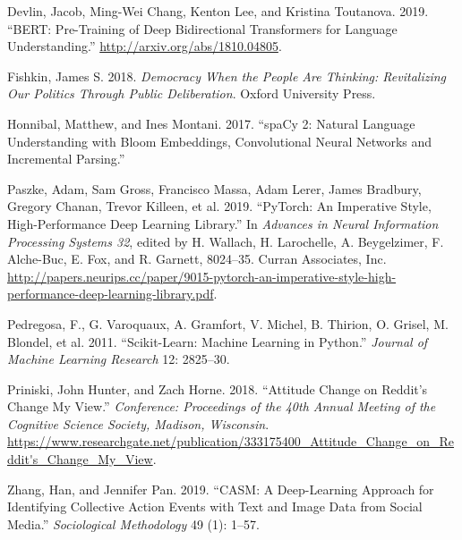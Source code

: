 \documentclass[12pt,]{article}
\begin{document}
\hypertarget{refs}{}
\leavevmode\hypertarget{ref-bert}{}%
Devlin, Jacob, Ming-Wei Chang, Kenton Lee, and Kristina Toutanova. 2019.
``BERT: Pre-Training of Deep Bidirectional Transformers for Language
Understanding.'' \url{http://arxiv.org/abs/1810.04805}.

\leavevmode\hypertarget{ref-fishkin}{}%
Fishkin, James S. 2018. \emph{Democracy When the People Are Thinking:
Revitalizing Our Politics Through Public Deliberation}. Oxford
University Press.

\leavevmode\hypertarget{ref-spacy2}{}%
Honnibal, Matthew, and Ines Montani. 2017. ``spaCy 2: Natural Language
Understanding with Bloom Embeddings, Convolutional Neural Networks and
Incremental Parsing.''

\leavevmode\hypertarget{ref-pytorch}{}%
Paszke, Adam, Sam Gross, Francisco Massa, Adam Lerer, James Bradbury,
Gregory Chanan, Trevor Killeen, et al. 2019. ``PyTorch: An Imperative
Style, High-Performance Deep Learning Library.'' In \emph{Advances in
Neural Information Processing Systems 32}, edited by H. Wallach, H.
Larochelle, A. Beygelzimer, F. Alche-Buc, E. Fox, and R. Garnett,
8024--35. Curran Associates, Inc.
\url{http://papers.neurips.cc/paper/9015-pytorch-an-imperative-style-high-performance-deep-learning-library.pdf}.

\leavevmode\hypertarget{ref-scikit-learn}{}%
Pedregosa, F., G. Varoquaux, A. Gramfort, V. Michel, B. Thirion, O.
Grisel, M. Blondel, et al. 2011. ``Scikit-Learn: Machine Learning in
Python.'' \emph{Journal of Machine Learning Research} 12: 2825--30.

\leavevmode\hypertarget{ref-cmv}{}%
Priniski, John Hunter, and Zach Horne. 2018. ``Attitude Change on
Reddit's Change My View.'' \emph{Conference: Proceedings of the 40th
Annual Meeting of the Cognitive Science Society, Madison, Wisconsin}.
\url{https://www.researchgate.net/publication/333175400_Attitude_Change_on_Reddit's_Change_My_View}.

\leavevmode\hypertarget{ref-zhang}{}%
Zhang, Han, and Jennifer Pan. 2019. ``CASM: A Deep-Learning Approach for
Identifying Collective Action Events with Text and Image Data from
Social Media.'' \emph{Sociological Methodology} 49 (1): 1--57.





\newpage
\singlespacing 
\end{document}
